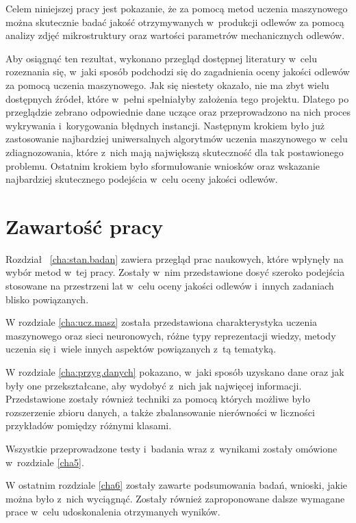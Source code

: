 Celem niniejszej pracy jest pokazanie, że za pomocą metod uczenia maszynowego można skutecznie badać jakość otrzymywanych w~produkcji odlewów za pomocą analizy zdjęć mikrostruktury oraz wartości parametrów mechanicznych odlewów. 

Aby osiągnąć ten rezultat, wykonano przegląd dostępnej literatury w~celu rozeznania się, w~jaki sposób podchodzi się do zagadnienia oceny jakości odlewów za pomocą uczenia maszynowego. Jak się niestety okazało, nie ma zbyt wielu dostępnych źródeł, które w~pełni spełniałyby założenia tego projektu. Dlatego po przeglądzie zebrano odpowiednie dane uczące oraz przeprowadzono na nich proces wykrywania i~korygowania błędnych instancji. Następnym krokiem było już zastosowanie najbardziej uniwersalnych algorytmów uczenia maszynowego w~celu zdiagnozowania, które z~nich mają największą skuteczność dla tak postawionego problemu. Ostatnim krokiem było sformułowanie wniosków oraz wskazanie najbardziej skutecznego podejścia w~celu oceny jakości odlewów.



\section{Zawartość pracy}
\label{sec:zawartosc}

Rozdział ~\ref{cha:stan.badan} zawiera przegląd prac naukowych, które wpłynęły na wybór metod w~tej pracy. Zostały w~nim przedstawione dosyć szeroko podejścia stosowane na przestrzeni lat w~celu oceny jakości odlewów i~innych zadaniach blisko powiązanych. 

W rozdziale \ref{cha:ucz.masz} została przedstawiona charakterystyka uczenia maszynowego oraz sieci neuronowych, różne typy reprezentacji wiedzy, metody uczenia się i~wiele innych aspektów powiązanych z~tą tematyką. 

W rozdziale \ref{cha:przyg.danych} pokazano, w~jaki sposób uzyskano dane oraz jak były one przekształcane, aby wydobyć z~nich jak najwięcej informacji. Przedstawione zostały również techniki za pomocą których możliwe było rozszerzenie zbioru danych, a także zbalansowanie nierówności w liczności przykładów pomiędzy różnymi klasami.

Wszystkie przeprowadzone testy i~badania wraz z~wynikami zostały omówione w~rozdziale \ref{cha5}. 

W ostatnim rozdziale \ref{cha6} zostały zawarte podsumowania badań, wnioski, jakie można było z~nich wyciągnąć. Zostały również zaproponowane dalsze wymagane prace w~celu udoskonalenia otrzymanych wyników.













